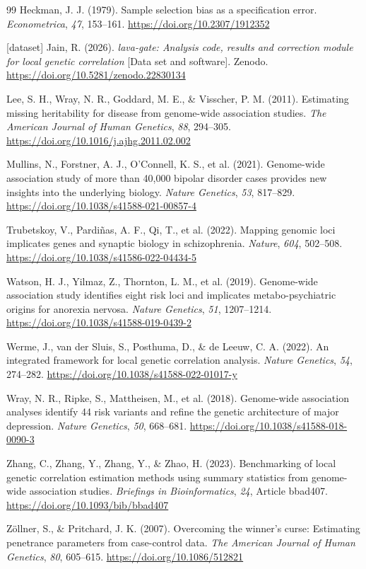 \documentclass[12pt,a4paper]{article}
\begin{document}
\begin{thebibliography}{99}
Heckman, J. J. (1979). Sample selection bias as a specification error. \emph{Econometrica}, \emph{47}, 153--161. \url{https://doi.org/10.2307/1912352}

[dataset] Jain, R. (2026). \emph{lava-gate: Analysis code, results and correction module for local genetic correlation} [Data set and software]. Zenodo. \url{https://doi.org/10.5281/zenodo.22830134}

Lee, S. H., Wray, N. R., Goddard, M. E., \& Visscher, P. M. (2011). Estimating missing heritability for disease from genome-wide association studies. \emph{The American Journal of Human Genetics}, \emph{88}, 294--305. \url{https://doi.org/10.1016/j.ajhg.2011.02.002}

Mullins, N., Forstner, A. J., O'Connell, K. S., et al. (2021). Genome-wide association study of more than 40,000 bipolar disorder cases provides new insights into the underlying biology. \emph{Nature Genetics}, \emph{53}, 817--829. \url{https://doi.org/10.1038/s41588-021-00857-4}

Trubetskoy, V., Pardi{\~n}as, A. F., Qi, T., et al. (2022). Mapping genomic loci implicates genes and synaptic biology in schizophrenia. \emph{Nature}, \emph{604}, 502--508. \url{https://doi.org/10.1038/s41586-022-04434-5}

Watson, H. J., Yilmaz, Z., Thornton, L. M., et al. (2019). Genome-wide association study identifies eight risk loci and implicates metabo-psychiatric origins for anorexia nervosa. \emph{Nature Genetics}, \emph{51}, 1207--1214. \url{https://doi.org/10.1038/s41588-019-0439-2}

Werme, J., van der Sluis, S., Posthuma, D., \& de Leeuw, C. A. (2022). An integrated framework for local genetic correlation analysis. \emph{Nature Genetics}, \emph{54}, 274--282. \url{https://doi.org/10.1038/s41588-022-01017-y}

Wray, N. R., Ripke, S., Mattheisen, M., et al. (2018). Genome-wide association analyses identify 44 risk variants and refine the genetic architecture of major depression. \emph{Nature Genetics}, \emph{50}, 668--681. \url{https://doi.org/10.1038/s41588-018-0090-3}

Zhang, C., Zhang, Y., Zhang, Y., \& Zhao, H. (2023). Benchmarking of local genetic correlation estimation methods using summary statistics from genome-wide association studies. \emph{Briefings in Bioinformatics}, \emph{24}, Article bbad407. \url{https://doi.org/10.1093/bib/bbad407}

Z{\"o}llner, S., \& Pritchard, J. K. (2007). Overcoming the winner's curse: Estimating penetrance parameters from case-control data. \emph{The American Journal of Human Genetics}, \emph{80}, 605--615. \url{https://doi.org/10.1086/512821}

\end{thebibliography}
\end{document}
